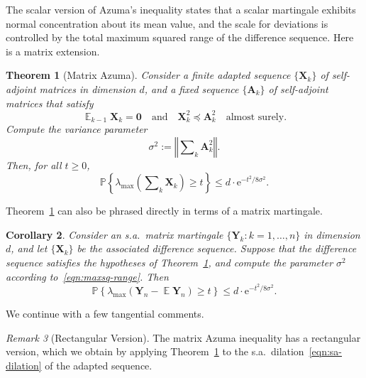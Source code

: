 \documentclass[11pt,letterpaper,twoside,reqno,draft]{amsart}
\newtheorem{thm}{Theorem}
\newtheorem{cor}[thm]{Corollary}
\theoremstyle{remark}
\newtheorem{rem}[thm]{Remark}
\numberwithin{equation}{section}
\numberwithin{thm}{section}
\begin{document}
The scalar version of Azuma's inequality states that a scalar martingale exhibits normal concentration about its mean value, and the scale for deviations is controlled by the total maximum squared range of the difference sequence.  Here is a matrix extension.

\begin{thm}[Matrix Azuma] \label{thm:matrix-azuma}
Consider a finite adapted sequence $\{ {\bm{{X}}}_k \}$ of self-adjoint matrices in dimension $d$, and a fixed sequence $\{ {\bm{{A}}}_k \}$ of self-adjoint matrices that satisfy
$$
{\operatorname{\mathbb{E}}}_{k-1} {\bm{{X}}}_k = {\bm{{0}}}
\quad\text{and}\quad
{\bm{{X}}}_k^2 {\preccurlyeq} {\bm{{A}}}_k^2
\quad\text{almost surely}.
$$
Compute the variance parameter
\begin{equation} \label{eqn:maxsq-range}
\sigma^2 := {\left\Vert {{ \sum\nolimits_k {\bm{{A}}}_k^2 }} \right\Vert}.
\end{equation}
Then, for all $t \geq 0$,
\begin{equation} \label{eqn:matrix-azuma}
{\mathbb{P}\left\{ {{ \lambda_{\max}\left( \sum\nolimits_k {\bm{{X}}}_k \right) \geq t }} \right\}}
	\leq d \cdot {\mathrm{e}}^{-t^2/8\sigma^2}.
\end{equation}
\end{thm}

Theorem~\ref{thm:matrix-azuma} can also be phrased directly in terms of a matrix martingale.

\begin{cor}
Consider an s.a.~matrix martingale $\{{\bm{{Y}}}_k : k = 1, \dots, n \}$ in dimension $d$, and let $\{{\bm{{X}}}_k\}$ be the associated difference sequence.  Suppose that the difference sequence satisfies the hypotheses of Theorem~\ref{thm:matrix-azuma}, and compute the parameter $\sigma^2$ according to~\eqref{eqn:maxsq-range}.  Then
\begin{equation} \label{eqn:azuma-martingale}
{\mathbb{P}\left\{ {{ \lambda_{\max}({\bm{{Y}}}_n - {\operatorname{\mathbb{E}}} {\bm{{Y}}}_n) \geq t }} \right\}}
	\leq d \cdot {\mathrm{e}}^{-t^2/8\sigma^2}.
\end{equation}
\end{cor}

We continue with a few tangential comments.

\begin{rem}[Rectangular Version]
The matrix Azuma inequality has a rectangular version, which we obtain by applying Theorem~\ref{thm:matrix-azuma} to the s.a.~dilation~\eqref{eqn:sa-dilation} of the adapted sequence.
\end{rem}
\end{document}
